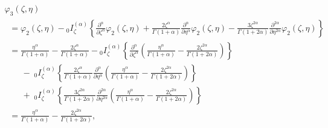 \documentclass[10pt]{NSP1}
\begin{document}
\begin{equation}
\label{eq34}
\begin{array}{lllll}
 \varphi _3 \left( {\zeta ,\eta } \right) \\
\;\; =\varphi _2 \left( {\zeta ,\eta } \right)-{ }_0I_\zeta ^{\left( \alpha
\right)}\left\{ {\frac{\partial ^\alpha }{\partial \zeta ^\alpha }\varphi _2
\left( {\zeta ,\eta } \right)+\frac{2\zeta ^\alpha }{\Gamma \left( {1+\alpha
} \right)}\frac{\partial ^\alpha }{\partial \eta ^\alpha }\varphi _2 \left(
{\zeta ,\eta } \right)-\frac{3\zeta ^{2\alpha }}{\Gamma \left( {1+2\alpha }
\right)}\frac{\partial ^{2\alpha }}{\partial \eta ^{2\alpha }}\varphi _2
\left( {\zeta ,\eta } \right)} \right\} \\
\;\; =\frac{\eta ^\alpha }{\Gamma \left( {1+\alpha } \right)}-\frac{2\zeta
^\alpha }{\Gamma \left( {1+\alpha } \right)}-{ }_0I_\zeta ^{\left( \alpha
\right)}\left\{ {\frac{\partial ^\alpha }{\partial \zeta ^\alpha }\left(
{\frac{\eta ^\alpha }{\Gamma \left( {1+\alpha } \right)}-\frac{2\zeta
^{2\alpha }}{\Gamma \left( {1+2\alpha } \right)}} \right)} \right\} \\
\qquad -\;_0I_\zeta ^{\left( \alpha \right)}\left\{ {\frac{2\zeta ^\alpha }{\Gamma
\left( {1+\alpha } \right)}\frac{\partial ^\alpha }{\partial \eta ^\alpha
}\left( {\frac{\eta ^\alpha }{\Gamma \left( {1+\alpha }
\right)}-\frac{2\zeta ^{2\alpha }}{\Gamma \left( {1+2\alpha } \right)}}
\right)} \right\} \\
\qquad +\;_0I_\zeta ^{\left( \alpha \right)}\left\{ {\frac{3\zeta ^{2\alpha
}}{\Gamma \left( {1+2\alpha } \right)}\frac{\partial ^{2\alpha }}{\partial
\eta ^{2\alpha }}\left( {\frac{\eta ^\alpha }{\Gamma \left( {1+\alpha }
\right)}-\frac{2\zeta ^{2\alpha }}{\Gamma \left( {1+2\alpha } \right)}}
\right)} \right\} \\
\;\; =\frac{\eta ^\alpha }{\Gamma \left( {1+\alpha } \right)}-\frac{2\zeta
^{2\alpha }}{\Gamma \left( {1+2\alpha } \right)},
 \end{array}
\end{equation}
\end{document}
